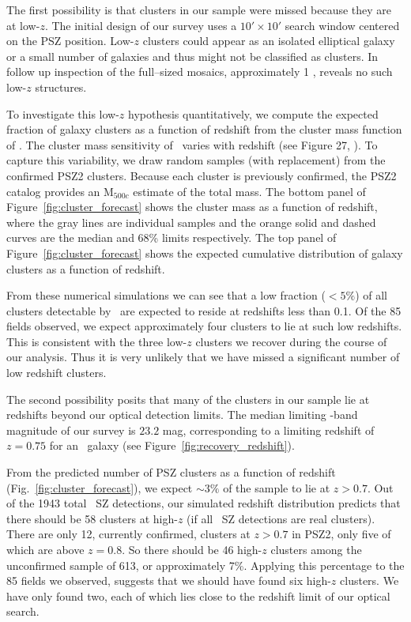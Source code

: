 \documentclass[apj, revtex4-1]{emulateapj}
\begin{document}
The first possibility is that clusters in our sample were missed because they are at low-$z$. The initial design of our survey uses a $10'\times10'$ search window centered on the PSZ position. Low-$z$ clusters could appear as an isolated elliptical galaxy or a small number of galaxies and thus might not be classified as clusters. In follow up inspection of the full--sized mosaics, approximately 1 \degsq, reveals no such low-$z$ structures.

To investigate this low-$z$ hypothesis quantitatively, we compute the expected fraction of galaxy clusters as a function of redshift from the cluster mass function of \cite{Tinker2008}. The cluster mass sensitivity of \planck\ varies with redshift (see Figure 27, \citealt{PlanckCollaboration2015a}). To capture this variability, we draw random samples (with replacement) from the confirmed PSZ2 clusters. Because each cluster is previously confirmed, the PSZ2 catalog provides an M$_{500c}$ estimate of the total mass. The bottom panel of Figure~\ref{fig:cluster_forecast} shows the cluster mass as a function of redshift, where the gray lines are individual samples and the orange solid and dashed curves are the median and 68\% limits respectively. The top panel of Figure~\ref{fig:cluster_forecast} shows the expected cumulative distribution of galaxy clusters as a function of redshift.

From these numerical simulations we can see that a low fraction ($<5\%$) of all clusters detectable by \planck\ are expected to reside at redshifts less than 0.1. Of the 85 fields observed, we expect approximately four clusters to lie at such low redshifts. This is consistent with the three low-$z$ clusters we recover during the course of our analysis. Thus it is very unlikely that we have missed a significant number of low redshift clusters.

The second possibility posits that many  of the clusters in our sample lie at redshifts beyond our optical detection limits. The median limiting \sdssi-band magnitude of our survey is $23.2$ mag, corresponding to a limiting redshift of $z=0.75$ for an \lstar\ galaxy (see Figure~\ref{fig:recovery_redshift}).

From the predicted number of PSZ clusters as a function of redshift (Fig.~\ref{fig:cluster_forecast}), we expect $\sim3\%$ of the sample to lie at $z>0.7$. Out of the 1943 total \planck\ SZ detections, our simulated redshift distribution predicts that there should be 58 clusters at high-$z$ (if all \planck\ SZ detections are real clusters).  There are only 12, currently confirmed, clusters at $z>0.7$ in PSZ2, only five of which are above $z=0.8$. So there should be 46 high-$z$ clusters among the unconfirmed sample of 613, or approximately 7\%. Applying this percentage to the 85 fields we observed, suggests that we should have found six high-$z$ clusters. We have only found two, each of which lies close to the redshift limit of our optical search.
\end{document}
